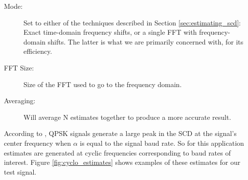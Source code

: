 \documentclass[12pt]{report}
\begin{document}
\begin{description}
    \item[Mode:] Set to either of the techniques described in Section
    \ref{sec:estimating_scd}: Exact time-domain frequency shifts, or a single
    FFT with frequency-domain shifts. The latter is what we are primarily concerned
    with, for its efficiency.
    \item[FFT Size:] Size of the FFT used to go to the frequency domain.
    \item[Averaging:] Will average N estimates together to produce a more accurate
    result.
\end{description}

According to \cite{Gardner2}, QPSK signals generate a large peak in the SCD at
the signal's center frequency when $\alpha$ is equal to the signal baud rate.
So for this application estimates are generated at cyclic frequencies
corresponding to baud rates of interest. Figure \ref{fig:cyclo_estimates} shows
examples of these estimates for our test signal.
\end{document}
